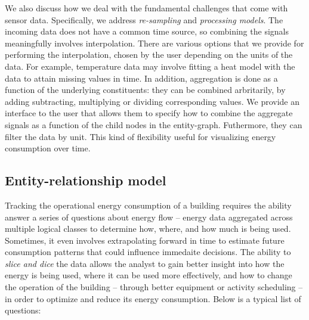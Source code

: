 \vspace{0.08in}

We also discuss how we deal with the fundamental challenges that come with sensor data.  Specifically, we 
address \emph{re-sampling} and \emph{processing models}.  The incoming data does not have a common
time source, so combining the signals meaningfully involves interpolation.  There are various options that we
provide for performing the interpolation, chosen by the user depending on the units of the data.  For example,
temperature data may involve fitting a heat model with the data to attain missing values in time.  In addition,
aggregation is done as a function of the underlying constituents: they can be combined arbritarily, by adding
subtracting, multiplying or dividing corresponding values.  We provide an interface to the user that
allows them to specify how to combine the aggregate signals as a function of the child nodes in the entity-graph.
Futhermore, they can filter the data by unit.  This kind of flexibility useful for visualizing
energy consumption over time.
















\subsection{Entity-relationship model}

Tracking the operational energy consumption of a building requires the ability answer a series of questions
about energy flow -- energy data aggregated across multiple logical classes to determine how, where, and how 
much is being used.  Sometimes, it even involves extrapolating forward in time to estimate 
future consumption patterns that could influence immedaite decisions.  The ability to \emph{slice and dice} 
the data allows the analyst
to gain better insight into how the energy is being used, where it can be used more effectively, and how
to change the operation of the building -- through better equipment or activity scheduling -- 
in order to optimize and reduce its energy consumption.
Below is a typical list of questions:

